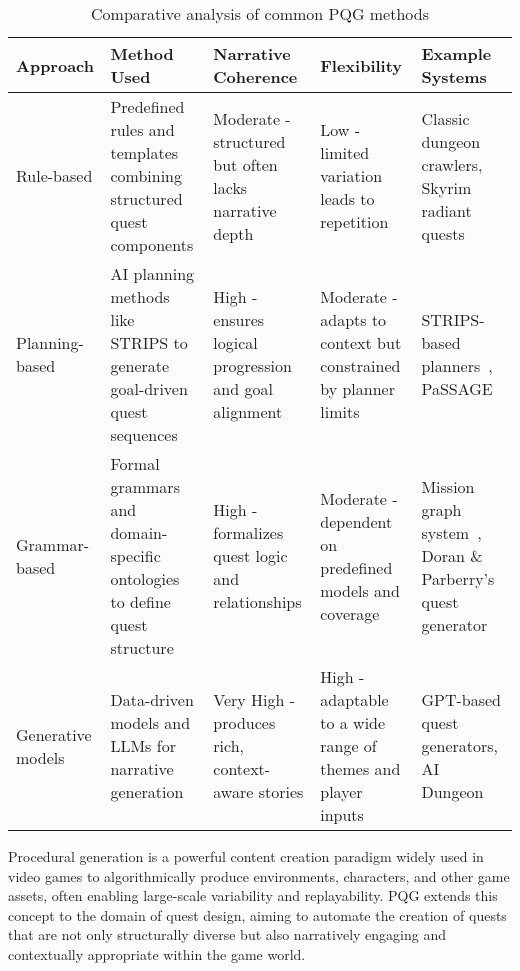 \begin{table}[t]
  \centering
  \scriptsize
  \renewcommand{\arraystretch}{1.3}
  \begin{tabularx}{0.95\textwidth}{
    >{\raggedright\arraybackslash}p{2.5cm}
    >{\raggedright\arraybackslash}p{3cm}
    >{\raggedright\arraybackslash}X
    >{\raggedright\arraybackslash}X
    >{\raggedright\arraybackslash}X
  }
    \toprule
    \textbf{Approach} & \textbf{Method Used} & \textbf{Narrative Coherence} & \textbf{Flexibility} & \textbf{Example Systems} \\
    \midrule
    Rule-based & Predefined rules and templates combining structured quest components & Moderate - structured but often lacks narrative depth & Low - limited variation leads to repetition & Classic dungeon crawlers, Skyrim radiant quests~\cite{skyrimradiantquest} \\
    Planning-based & AI planning methods like STRIPS to generate goal-driven quest sequences & High - ensures logical progression and goal alignment & Moderate - adapts to context but constrained by planner limits & STRIPS-based planners~\cite{fikes1971strips}, PaSSAGE~\cite{thue2007interactive} \\
    Grammar-based & Formal grammars and domain-specific ontologies to define quest structure & High - formalizes quest logic and relationships & Moderate - dependent on predefined models and coverage & Mission graph system~\cite{dormans2010adventures}, Doran \& Parberry's quest generator~\cite{doran2011prototype} \\
    Generative models & Data-driven models and LLMs for narrative generation & Very High - produces rich, context-aware stories & High - adaptable to a wide range of themes and player inputs & GPT-based quest generators, AI Dungeon~\cite{ai-dungeon} \\
    \bottomrule
  \end{tabularx}
  \caption{Comparative analysis of common PQG methods}
  \label{table:pqg-approaches}
\end{table}

Procedural generation is a powerful content creation paradigm widely used in video games
to algorithmically produce environments, characters, and other game assets, often enabling
large-scale variability and replayability. PQG extends this concept to the domain
of quest design, aiming to automate the creation of quests that are not only structurally
diverse but also narratively engaging and contextually appropriate within the game world.

